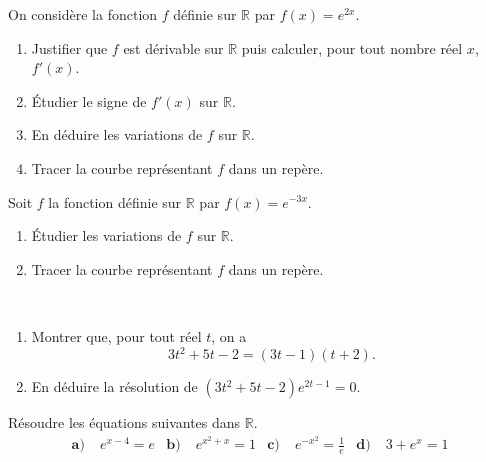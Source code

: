 \documentclass[11pt]{article}
\begin{document}
\begin{exo}
  On considère la fonction $f$ définie sur $\mathbb{R}$ par $f(x)=e^{2x}$.
  \begin{enumerate}
    \item Justifier que $f$ est dérivable sur $\mathbb{R}$ puis calculer, pour
      tout nombre réel $x$, $f'(x)$.
    \item Étudier le signe de $f'(x)$ sur $\mathbb{R}$.
    \item En déduire les variations de $f$ sur $\mathbb{R}$.
    \item Tracer la courbe représentant $f$ dans un repère.
  \end{enumerate}
\end{exo}

\begin{exo}
  Soit $f$ la fonction définie sur $\mathbb{R}$ par $f(x)=e^{-3x}$.
  \begin{enumerate}
    \item Étudier les variations de $f$ sur $\mathbb{R}$.
    \item Tracer la courbe représentant $f$ dans un repère.
  \end{enumerate}
\end{exo}

\begin{exo}~
  \begin{enumerate}
    \item Montrer que, pour tout réel $t$, on a
      \[
        3t^2+5t-2 = (3t-1)(t+2).
      \]
    \item En déduire la résolution de $(3t^2+5t-2)e^{2t-1}=0$.
  \end{enumerate}
\end{exo}

\begin{exo}
  Résoudre les équations suivantes dans $\mathbb{R}$.
  \begin{align*}
    \textbf{a)}\;& e^{x-4} = e &
    \textbf{b)}\;& e^{x^2+x}= 1 &
    \textbf{c)}\;& e^{-x^2} = \frac{1}{e} &
    \textbf{d)}\;& 3+e^x=1
  \end{align*}
\end{exo}
\end{document}
